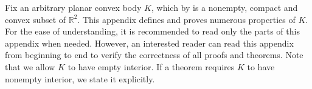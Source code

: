 Fix an arbitrary planar convex body \(K\), which by  is a nonempty, compact and convex subset of \(\mathbb{R}^2\). This appendix defines and proves numerous properties of \(K\). For the ease of understanding, it is recommended to read only the parts of this appendix when needed. However, an interested reader can read this appendix from beginning to end to verify the correctness of all proofs and theorems. Note that we allow \(K\) to have empty interior. If a theorem requires \(K\) to have nonempty interior, we state it explicitly.